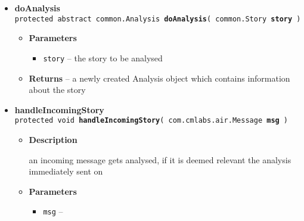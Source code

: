 {{{\begin{itemize}
{\begin{itemize}
{Message reception handler. It is called on the object implementing this interface which was set in AirBrush.
}
\item{
{\bf Parameters}
  \begin{itemize}
   \item{
{\tt msg} -- }
  \end{itemize}
}%
\item{{\bf Returns} -- 
true if the message was handled, false if it wasn't 
}%
\item{{\bf See also}
  \begin{itemize}
\item{ {\tt common.AirBrush.setCallbackObject(AirBrushCallable)} {\small 
{}}%
}
  \end{itemize}
}%
\end{itemize}
}%
 \item{ 
{\bf doAnalysis}\\
{\tt protected abstract common.Analysis\ {\bf doAnalysis}( {\tt common.Story} {\bf story} )
\label{amber.Sieve.doAnalysis(amber.common.Story)}}%
\begin{itemize}
\item{
{\bf Parameters}
  \begin{itemize}
   \item{
{\tt story} -- the story to be analysed}
  \end{itemize}
}%
\item{{\bf Returns} -- 
a newly created Analysis object which contains information about the story 
}%
\end{itemize}
}%
 \item{ 
{\bf handleIncomingStory}\\
{\tt protected void\ {\bf handleIncomingStory}( {\tt com.cmlabs.air.Message} {\bf msg} )
\label{amber.Sieve.handleIncomingStory(com.cmlabs.air.Message)}}%
\begin{itemize}
\item{
{\bf Description}

an incoming message gets analysed, if it is deemed relevant the analysis immediately sent on
}
\item{
{\bf Parameters}
  \begin{itemize}
   \item{
{\tt msg} -- }
  \end{itemize}
}%
\end{itemize}
}%
\end{itemize}
}
}
}
